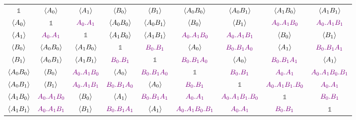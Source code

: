 \documentclass[
  12pt          %
  ,letterpaper  %
  ,center       %
  ,noupper      %
  ,english,fleqn]{uconnthesis}
\newcommand{\purp}[1]{{\color{purple}{#1}\color{black}}}
\newcommand {\id}[0]{\ensuremath{\mathds{1}}}
\begin{document}
\begin{landscape}
\begin{table*}[hbtp]
\begin{tabularx}{\linewidth}{|cCCCCCCCC|}
\toprule
\(\id \)&\( \Braket{A_0}  \)&\( \Braket{A_1}  \)&\( \Braket{B_0}  \)&\( \Braket{B_1}  \)&\( \Braket{A_0 B_0}  \)&\( \Braket{A_0 B_1}  \)&\( \Braket{A_1 B_0}  \)&\( \Braket{A_1 B_1}  \)\\\(
 \Braket{A_0}  \)&\( \id \)&\( \purp{A_0.A_1}  \)&\( \Braket{A_0 B_0}  \)&\( \Braket{A_0 B_1}  \)&\( \Braket{B_0}  \)&\( \Braket{B_1}  \)&\( \purp{A_0.A_1 B_0}  \)&\( \purp{A_0.A_1 B_1}  \)\\\(
 \Braket{A_1}  \)&\( \purp{A_0.A_1}  \)&\( \id \)&\( \Braket{A_1 B_0}  \)&\( \Braket{A_1 B_1}  \)&\( \purp{A_0.A_1 B_0}  \)&\( \purp{A_0.A_1 B_1}  \)&\( \Braket{B_0}  \)&\( \Braket{B_1}  \)\\\(
 \Braket{B_0}  \)&\( \Braket{A_0 B_0}  \)&\( \Braket{A_1 B_0}  \)&\( \id \)&\( \purp{B_0.B_1}  \)&\( \Braket{A_0}  \)&\( \purp{B_0.B_1 A_0}  \)&\( \Braket{A_1}  \)&\( \purp{B_0.B_1 A_1}  \)\\\(
 \Braket{B_1}  \)&\( \Braket{A_0 B_1}  \)&\( \Braket{A_1 B_1}  \)&\( \purp{B_0.B_1}  \)&\( \id \)&\( \purp{B_0.B_1 A_0}  \)&\( \Braket{A_0}  \)&\( \purp{B_0.B_1 A_1}  \)&\( \Braket{A_1}  \)\\\(
 \Braket{A_0 B_0}  \)&\( \Braket{B_0}  \)&\( \purp{A_0.A_1 B_0}  \)&\( \Braket{A_0}  \)&\( \purp{B_0.B_1 A_0}  \)&\( \id \)&\( \purp{B_0.B_1}  \)&\( \purp{A_0.A_1}  \)&\( \purp{A_0.A_1 B_0.B_1}  \)\\\(
 \Braket{A_0 B_1}  \)&\( \Braket{B_1}  \)&\( \purp{A_0.A_1 B_1}  \)&\( \purp{B_0.B_1 A_0}  \)&\( \Braket{A_0}  \)&\( \purp{B_0.B_1}  \)&\( \id \)&\( \purp{A_0.A_1 B_1.B_0}  \)&\( \purp{A_0.A_1}  \)\\\(
 \Braket{A_1 B_0}  \)&\( \purp{A_0.A_1 B_0}  \)&\( \Braket{B_0}  \)&\( \Braket{A_1}  \)&\( \purp{B_0.B_1 A_1}  \)&\( \purp{A_0.A_1}  \)&\( \purp{A_0.A_1 B_1.B_0}  \)&\( \id \)&\( \purp{B_0.B_1}  \)\\ \(
 \Braket{A_1 B_1}  \)&\( \purp{A_0.A_1 B_1}  \)&\( \Braket{B_1}  \)&\( \purp{B_0.B_1 A_1}  \)&\( \Braket{A_1}  \)&\( \purp{A_0.A_1 B_0.B_1}  \)&\( \purp{A_0.A_1}  \)&\( \purp{B_0.B_1}  \)&\( \id \)\\
 \bottomrule

\end{tabularx}
\end{table*}
\end{landscape}
\restoregeometry
\end{document}
